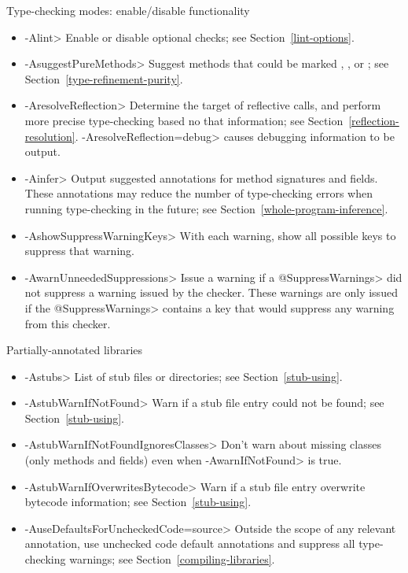 Type-checking modes:  enable/disable functionality
\begin{itemize}
\item \<-Alint>
  Enable or disable optional checks; see Section~\ref{lint-options}.
\item \<-AsuggestPureMethods>
  Suggest methods that could be marked
  ,
  ,
  or ; see
  Section~\ref{type-refinement-purity}.
\item \<-AresolveReflection>
  Determine the target of reflective calls, and perform more precise
  type-checking based no that information; see
  Section~\ref{reflection-resolution}.  \<-AresolveReflection=debug> causes
  debugging information to be output.
\item \<-Ainfer>
  Output suggested annotations for method signatures and fields.
  These annotations may reduce the number of type-checking
  errors when running type-checking in the future; see
  Section~\ref{whole-program-inference}.
\item \<-AshowSuppressWarningKeys>
  With each warning, show all possible keys to suppress that warning.
\item \<-AwarnUnneededSuppressions>
  Issue a warning if a \<@SuppressWarnings> did not suppress a warning issued by
  the checker.  These warnings are only issued if the \<@SuppressWarnings>
  contains a key that would suppress any warning from this checker.
\end{itemize}

Partially-annotated libraries
\begin{itemize}
\item \<-Astubs>
  List of stub files or directories; see Section~\ref{stub-using}.
\item \<-AstubWarnIfNotFound>
  Warn if a stub file entry could not be found; see Section~\ref{stub-using}.
\item \<-AstubWarnIfNotFoundIgnoresClasses>
  Don't warn about missing classes (only methods and fields) even when \<-AwarnIfNotFound> is true.
\item \<-AstubWarnIfOverwritesBytecode>
  Warn if a stub file entry overwrite bytecode information; see
  Section~\ref{stub-using}.
\item \<-AuseDefaultsForUncheckedCode=source>
  Outside the scope of any relevant
   annotation, use unchecked code
  default annotations and suppress all type-checking warnings; see
  Section~\ref{compiling-libraries}.
\end{itemize}

